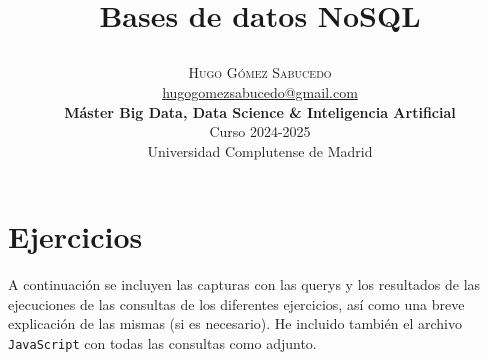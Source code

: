 \documentclass[a4paper,onecolumn]{article}
\title{\begin{center} \Huge Bases de datos NoSQL \end{center}} %
\author{
    \textsc{\Huge Hugo Gómez Sabucedo} \\ %
    \large \href{mailto:hugogomezsabucedo@gmail.com}{hugogomezsabucedo@gmail.com} \\ [2ex] %
    \Large \textbf{Máster Big Data, Data Science \& Inteligencia Artificial} \\
    \normalsize Curso 2024-2025 \\
    \large Universidad Complutense de Madrid
}
\date{} %
\let\stdsection\section
\renewcommand\section{\newpage\stdsection}
\begin{document}
\maketitle
\begin{sloppypar}


\section{Ejercicios} \label{ejericios}
A continuación se incluyen las capturas con las querys y los resultados de las ejecuciones de las consultas de los diferentes ejercicios, así como una breve 
explicación de las mismas (si es necesario). He incluido también el archivo \texttt{JavaScript} con todas las consultas como adjunto.


\end{sloppypar}
\end{document}
